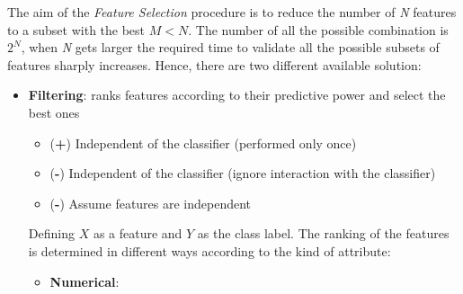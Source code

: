 The aim of the \emph{Feature Selection} procedure is to reduce the number of \emph{N} features to a subset with the best $M < N$. The number of all the possible combination is $2^N$, when \emph{N} gets larger the required time to validate all the possible subsets of features sharply increases. Hence, there are two different available solution:
\begin{itemize}
\item \textbf{Filtering}: ranks features according to their predictive power and select the best ones
\begin{itemize}
\item (\textbf{+}) Independent of the classifier (performed only once)
\item (\textbf{-}) Independent of the classifier (ignore interaction with the classifier)
\item (\textbf{-}) Assume features are independent
\end{itemize}

Defining $X$ as a feature and $Y$ as the class label. The ranking of the features is determined in different ways according to the kind of attribute:
\begin{itemize}
\item \textbf{Numerical}:


\end{itemize}
\end{itemize}
